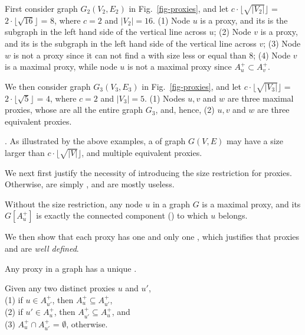 \vspace{-0.5ex}
\begin{example}
\label{exm-proxies} First consider graph $G_2(V_2, E_2)$ in Fig.~\ref{fig-proxies}, and let $c\cdot\lfloor\sqrt{|V_2|}\rfloor$ =
$2\cdot\lfloor\sqrt{16}\rfloor$ = $8$, where $c = 2$ and $|V_2| = 16$.
\sstab(1) Node $u$ is a proxy, and its \dra is the subgraph in the left hand side of the vertical line across $u$;
\sstab(2) Node $v$ is a proxy, and its \dra is the subgraph in the left hand side of the vertical line across $v$;
\sstab(3) Node $w$ is not a proxy since it can not find a \dra with size less or equal than $8$;
\sstab(4)  Node $v$ is a maximal proxy, while node $u$ is not a maximal proxy since $A^+_u\subset A^+_v$.


We then consider graph $G_3(V_3, E_3)$ in Fig.~\ref{fig-proxies}, and let $c\cdot\lfloor\sqrt{|V_3|}\rfloor$ =
$2\cdot\lfloor\sqrt{5}\rfloor$ = $4$, where $c = 2$ and $|V_3| = 5$.
\sstab(1) Nodes $u, v$ and $w$ are three maximal proxies, whose \dras are all the entire graph $G_3$, and, hence,
\sstab(2) $u, v$ and $w$ are three equivalent proxies.
 \end{example}

\vspace{-1ex}
. As illustrated by the above examples,  a \dra of graph $G(V, E)$ may have a size larger than $c\cdot\lfloor\sqrt{|V|}\rfloor$,
and multiple equivalent proxies.


We next first justify the necessity of introducing the size restriction for proxies.  Otherwise, \dras are simply \ccs, and are mostly useless.


\begin{prop}
\label{prop-proxy-cc} Without the size restriction, any node $u$ in a graph $G$ is a maximal proxy,
and its \dra $G[A^+_u]$ is exactly the connected component (\cc) to which $u$ belongs.
\end{prop}


We then show that each proxy has one and only one \dra, which justifies that  proxies and \dras are {\em well defined}.


\begin{prop}
\label{prop-proxy-unique-dra} Any proxy in a graph has a unique \dra.
\end{prop}


\begin{prop}
\label{thm-proxy-disjoint} Given any two distinct proxies $u$ and $u'$, \\
(1) if $u\in A^+_{u'}$, then $A^+_{u}\subseteq A^+_{u'}$, \\
(2) if $u'\in A^+_{u}$, then $A^+_{u'}\subseteq A^+_{u}$,  and \\
(3) $A^+_{u}\cap A^+_{u'}$ = $\emptyset$, otherwise.
\end{prop}

